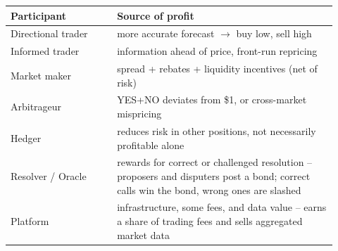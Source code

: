 \begin{frame}[t]
\par{}
\begin{pmbody}
\vspace{4pt}
{\centering
\fontsize{18}{23}\selectfont\begin{tabular}{>{\raggedright\arraybackslash}p{0.30\linewidth}>{\raggedright\arraybackslash}p{0.62\linewidth}}
\toprule
\rowcolor{pmPanel}\textcolor{pmNavy}{\textbf{Participant}} & \textcolor{pmNavy}{\textbf{Source of profit}} \\
\midrule
Directional trader & more accurate forecast $\to$ buy low, sell high \\
Informed trader & information ahead of price, front-run repricing \\
Market maker & spread + rebates + liquidity incentives (net of risk) \\
Arbitrageur & YES+NO deviates from \$1, or cross-market mispricing \\
Hedger & reduces risk in other positions, not necessarily profitable alone \\
Resolver / Oracle & rewards for correct or challenged resolution -- proposers and disputers post a bond; correct calls win the bond, wrong ones are slashed \\
Platform & infrastructure, some fees, and data value -- earns a share of trading fees and sells aggregated market data \\
\bottomrule
\end{tabular}\par}
\end{pmbody}
\end{frame}

